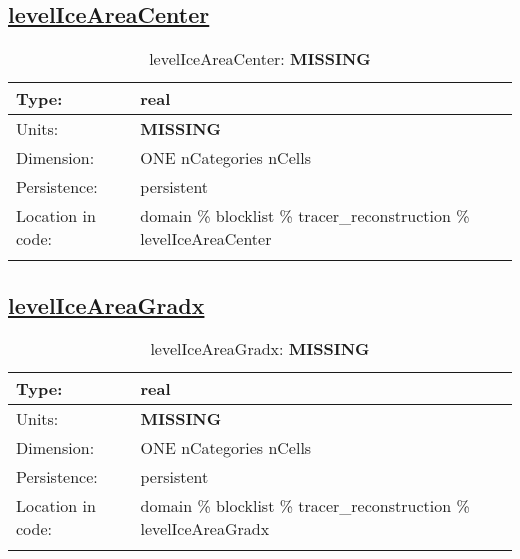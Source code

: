 \subsection[levelIceAreaCenter]{\hyperref[sec:var_tab_tracer_reconstruction]{levelIceAreaCenter}}
\label{subsec:var_sec_tracer_reconstruction_levelIceAreaCenter}
\begin{center}
\begin{longtable}{| p{2.0in} | p{4.0in} |}
        \hline 
        Type: & real \\
        \hline 
        Units: & {\bf \color{red} MISSING} \\
        \hline 
        Dimension: & ONE nCategories nCells \\
        \hline 
        Persistence: & persistent \\
        \hline 
         Location in code: & domain \% blocklist \% tracer\_reconstruction \% levelIceAreaCenter \\
         \hline 
    \caption{levelIceAreaCenter: {\bf \color{red} MISSING}}
\end{longtable}
\end{center}
\subsection[levelIceAreaGradx]{\hyperref[sec:var_tab_tracer_reconstruction]{levelIceAreaGradx}}
\label{subsec:var_sec_tracer_reconstruction_levelIceAreaGradx}
\begin{center}
\begin{longtable}{| p{2.0in} | p{4.0in} |}
        \hline 
        Type: & real \\
        \hline 
        Units: & {\bf \color{red} MISSING} \\
        \hline 
        Dimension: & ONE nCategories nCells \\
        \hline 
        Persistence: & persistent \\
        \hline 
         Location in code: & domain \% blocklist \% tracer\_reconstruction \% levelIceAreaGradx \\
         \hline 
    \caption{levelIceAreaGradx: {\bf \color{red} MISSING}}
\end{longtable}
\end{center}
